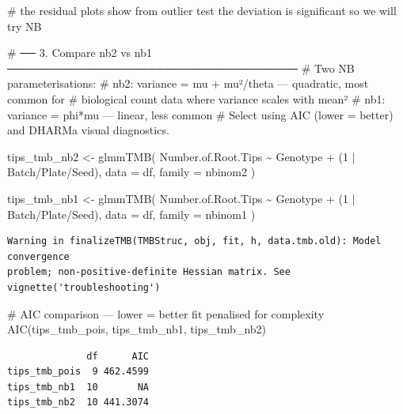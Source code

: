 \documentclass[
  letterpaper,
  DIV=11,
  numbers=noendperiod]{scrartcl}
\newenvironment{Shaded}{\begin{snugshade}}{\end{snugshade}}
\newcommand{\AttributeTok}[1]{\textcolor[rgb]{0.40,0.45,0.13}{#1}}
\newcommand{\CommentTok}[1]{\textcolor[rgb]{0.37,0.37,0.37}{#1}}
\newcommand{\DecValTok}[1]{\textcolor[rgb]{0.68,0.00,0.00}{#1}}
\newcommand{\FunctionTok}[1]{\textcolor[rgb]{0.28,0.35,0.67}{#1}}
\newcommand{\NormalTok}[1]{\textcolor[rgb]{0.00,0.23,0.31}{#1}}
\newcommand{\OtherTok}[1]{\textcolor[rgb]{0.00,0.23,0.31}{#1}}
\newcommand{\SpecialCharTok}[1]{\textcolor[rgb]{0.37,0.37,0.37}{#1}}
\begin{document}
\begin{Shaded}
\begin{Highlighting}[]
\CommentTok{\# the residual plots show from outlier test the deviation is significant so we will try NB}

\CommentTok{\# ── 3. Compare nb2 vs nb1 ─────────────────────────────────────}
\CommentTok{\# Two NB parameterisations:}
\CommentTok{\#   nb2: variance = mu + mu²/theta — quadratic, most common for}
\CommentTok{\#        biological count data where variance scales with mean²}
\CommentTok{\#   nb1: variance = phi*mu — linear, less common}
\CommentTok{\# Select using AIC (lower = better) and DHARMa visual diagnostics.}

\NormalTok{tips\_tmb\_nb2 }\OtherTok{\textless{}{-}} \FunctionTok{glmmTMB}\NormalTok{(}
\NormalTok{  Number.of.Root.Tips }\SpecialCharTok{\textasciitilde{}}\NormalTok{ Genotype }\SpecialCharTok{+}\NormalTok{ (}\DecValTok{1} \SpecialCharTok{|}\NormalTok{ Batch}\SpecialCharTok{/}\NormalTok{Plate}\SpecialCharTok{/}\NormalTok{Seed),}
  \AttributeTok{data =}\NormalTok{ df, }\AttributeTok{family =}\NormalTok{ nbinom2}
\NormalTok{)}

\NormalTok{tips\_tmb\_nb1 }\OtherTok{\textless{}{-}} \FunctionTok{glmmTMB}\NormalTok{(}
\NormalTok{  Number.of.Root.Tips }\SpecialCharTok{\textasciitilde{}}\NormalTok{ Genotype }\SpecialCharTok{+}\NormalTok{ (}\DecValTok{1} \SpecialCharTok{|}\NormalTok{ Batch}\SpecialCharTok{/}\NormalTok{Plate}\SpecialCharTok{/}\NormalTok{Seed),}
  \AttributeTok{data =}\NormalTok{ df, }\AttributeTok{family =}\NormalTok{ nbinom1}
\NormalTok{)}
\end{Highlighting}
\end{Shaded}

\begin{verbatim}
Warning in finalizeTMB(TMBStruc, obj, fit, h, data.tmb.old): Model convergence
problem; non-positive-definite Hessian matrix. See vignette('troubleshooting')
\end{verbatim}

\begin{Shaded}
\begin{Highlighting}[]
\CommentTok{\# AIC comparison — lower = better fit penalised for complexity}
\FunctionTok{AIC}\NormalTok{(tips\_tmb\_pois, tips\_tmb\_nb1, tips\_tmb\_nb2)}
\end{Highlighting}
\end{Shaded}

\begin{verbatim}
              df      AIC
tips_tmb_pois  9 462.4599
tips_tmb_nb1  10       NA
tips_tmb_nb2  10 441.3074
\end{verbatim}
\end{document}
